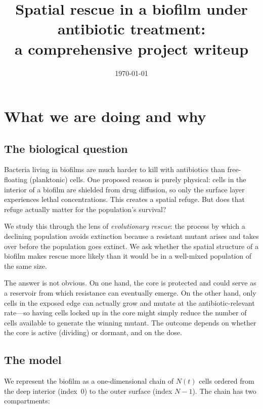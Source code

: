 \documentclass[12pt]{article}
\title{Spatial rescue in a biofilm under antibiotic treatment:\\
a comprehensive project writeup}
\author{}
\date{\today}
\begin{document}
\maketitle
\tableofcontents
\newpage

\section{What we are doing and why}
\label{sec:overview}

\subsection{The biological question}

Bacteria living in biofilms are much harder to kill with antibiotics than
free-floating (planktonic) cells. One proposed reason is purely physical:
cells in the interior of a biofilm are shielded from drug diffusion, so
only the surface layer experiences lethal concentrations. This creates a
spatial refuge. But does that refuge actually matter for the population's
survival?

We study this through the lens of \emph{evolutionary rescue}: the process
by which a declining population avoids extinction because a resistant mutant
arises and takes over before the population goes extinct. We ask whether
the spatial structure of a biofilm makes rescue more likely than it would
be in a well-mixed population of the same size.

The answer is not obvious. On one hand, the core is protected and could
serve as a reservoir from which resistance can eventually emerge. On the
other hand, only cells in the exposed edge can actually grow and mutate at
the antibiotic-relevant rate---so having cells locked up in the core might
simply reduce the number of cells available to generate the winning mutant.
The outcome depends on whether the core is active (dividing) or dormant,
and on the dose.

\subsection{The model}
\label{sec:model}

We represent the biofilm as a one-dimensional chain of $N(t)$ cells ordered
from the deep interior (index~0) to the outer surface (index $N-1$). The
chain has two compartments:
\end{document}

